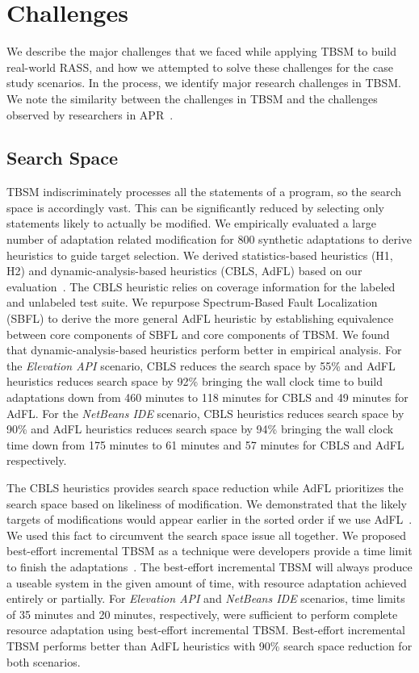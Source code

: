\section{Challenges}
We describe the major challenges that we faced while applying TBSM to build real-world RASS, and how we attempted to solve these challenges for the case study scenarios. In the process, we identify major research challenges in TBSM. We note the similarity between the challenges in TBSM and the challenges observed by researchers in APR~\cite{LeGoues2013}.

\subsection{Search Space}
TBSM indiscriminately processes all the statements of a program, so the search space is accordingly vast. This can be significantly reduced by selecting only statements likely to actually be modified. We empirically evaluated a large number of adaptation related modification for 800 synthetic adaptations to derive heuristics to guide target selection. We derived statistics-based heuristics (H1, H2) and dynamic-analysis-based heuristics (CBLS, AdFL) based on our evaluation~\cite{christi2018qrs,christi2019qrs}. The CBLS heuristic relies on coverage information for the labeled and unlabeled test suite. We repurpose Spectrum-Based Fault Localization (SBFL) to derive the more general AdFL heuristic by establishing equivalence between core components of SBFL and core components of TBSM. We found that dynamic-analysis-based heuristics  perform better in empirical analysis. For the \textit{Elevation API} scenario, CBLS reduces the search space by 55\% and AdFL heuristics reduces search space by 92\% bringing the wall clock time to build adaptations down from 460 minutes to 118 minutes for CBLS and 49 minutes for AdFL.  For the \textit{NetBeans IDE} scenario, CBLS heuristics reduces search space by 90\% and AdFL heuristics reduces search space by 94\% bringing the wall clock time down from 175 minutes to 61 minutes and 57 minutes for CBLS and AdFL respectively. 

The CBLS heuristics provides search space reduction while AdFL prioritizes the search space based on likeliness of modification. We demonstrated that the likely targets of modifications would appear earlier in the sorted order if we use AdFL~\cite{christi2019qrs}. We used this fact to circumvent the search space issue all together. We proposed best-effort incremental TBSM as a technique were developers provide a time limit to finish the adaptations~\cite{christi2019qrs}. The best-effort incremental TBSM will always produce a useable system in the given amount of time, with resource adaptation achieved entirely or partially. For \textit{Elevation API} and \textit{NetBeans IDE} scenarios, time limits of 35 minutes and 20 minutes, respectively, were sufficient to perform complete resource adaptation using best-effort incremental TBSM. Best-effort incremental TBSM performs better than AdFL heuristics with 90\% search space reduction for both scenarios. 

